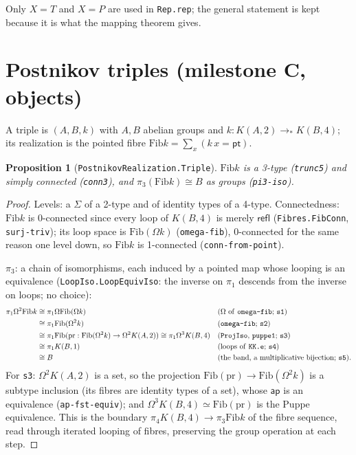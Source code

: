\documentclass[11pt]{amsart}
\newtheorem{proposition}[theorem]{Proposition}
\theoremstyle{definition}
\theoremstyle{remark}
\newcommand{\Om}{\Omega}
\newcommand{\Fib}{\mathrm{Fib}}
\newcommand{\code}[1]{\texttt{#1}}
\begin{document}
Only $X=T$ and $X=P$ are used in \code{Rep.rep}; the general statement is
kept because it is what the mapping theorem gives.

\section{Postnikov triples (milestone C, objects)}

A triple is $(A,B,k)$ with $A,B$ abelian groups and $k:K(A,2)\to_*K(B,4)$;
its realization is the pointed fibre $\Fib k=\sum_{x}(k\,x=\mathsf{pt})$.

\begin{proposition}[\code{PostnikovRealization.Triple}]\label{prop:triple}
$\Fib k$ is a 3-type (\code{trunc5}) and simply connected (\code{conn3}),
and $\pi_3(\Fib k)\cong B$ as groups (\code{pi3-iso}).
\end{proposition}
\begin{proof}
Levels: a $\Sigma$ of a 2-type and of identity types of a 4-type.
Connectedness: $\Fib k$ is 0-connected since every loop of $K(B,4)$ is
merely $\mathsf{refl}$ (\code{Fibres.FibConn}, \code{surj-triv}); its loop
space is $\Fib(\Om k)$ (\code{omega-fib}), 0-connected for the same
reason one level down, so $\Fib k$ is 1-connected
(\code{conn-from-point}).

$\pi_3$: a chain of isomorphisms, each induced by a pointed map whose
looping is an equivalence (\code{LoopIso.LoopEquivIso}: the inverse on
$\pi_1$ descends from the inverse on loops; no choice):
\begin{align*}
\pi_1\Om^2\Fib k
 &\cong \pi_1\Om\Fib(\Om k)        &&\text{($\Om$ of \code{omega-fib}; \code{s1})}\\
 &\cong \pi_1\Fib(\Om^2k)           &&\text{(\code{omega-fib}; \code{s2})}\\
 &\cong \pi_1\Fib(\mathrm{pr}:\Fib(\Om^2k)\to\Om^2K(A,2)) \cong \pi_1\Om^3K(B,4)
   &&\text{(\code{ProjIso}, \code{puppe1}; \code{s3})}\\
 &\cong \pi_1K(B,1)                 &&\text{(loops of \code{KK.e}; \code{s4})}\\
 &\cong B                           &&\text{(the band, a multiplicative bijection; \code{s5}).}
\end{align*}
For \code{s3}: $\Om^2K(A,2)$ is a set, so the projection
$\Fib(\mathrm{pr})\to\Fib(\Om^2k)$ is a subtype inclusion (its fibres are
identity types of a set), whose $\mathsf{ap}$ is an equivalence
(\code{ap-fst-equiv}); and $\Om^3K(B,4)\simeq\Fib(\mathrm{pr})$ is the
Puppe equivalence. This is the boundary $\pi_4K(B,4)\to\pi_3\Fib k$ of the
fibre sequence, read through iterated looping of fibres, preserving the
group operation at each step.
\end{proof}
\end{document}
